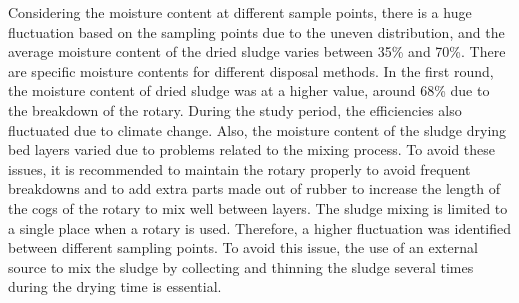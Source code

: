 Considering the moisture content at different sample points, there is a huge fluctuation based on the sampling points due to the uneven distribution, and the average moisture content of the dried sludge varies between 35\% and 70\%. There are specific moisture contents for different disposal methods. In the first round, the moisture content of dried sludge was at a higher value, around 68\% due to the breakdown of the rotary. During the study period, the efficiencies also fluctuated due to climate change. Also, the moisture content of the sludge drying bed layers varied due to problems related to the mixing process. To avoid these issues, it is recommended to maintain the rotary properly to avoid frequent breakdowns and to add extra parts made out of rubber to increase the length of the cogs of the rotary to mix well between layers. The sludge mixing is limited to a single place when a rotary is used. Therefore, a higher fluctuation was identified between different sampling points. To avoid this issue, the use of an external source to mix the sludge by collecting and thinning the sludge several times during the drying time is essential. 
